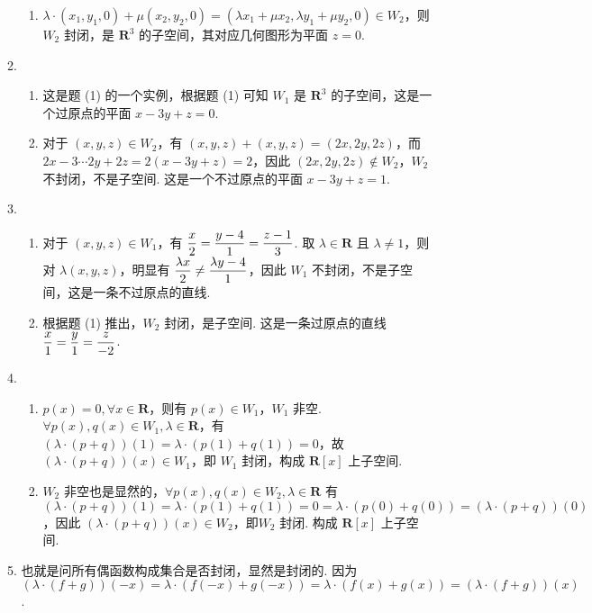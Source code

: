 \begin{enumerate}
\begin{enumerate}
\begin{enumerate}
                        \item $\lambda\cdot(x_1,y_1,0)+\mu(x_2,y_2,0)=(\lambda x_1+\mu x_2,\lambda y_1+\mu y_2,0)\in W_2$，则 $W_2$ 封闭，是 $\mathbf{R}^3$ 的子空间，其对应几何图形为平面 $z=0$.
                    \end{enumerate}

              \item \begin{enumerate}
                        \item 这是题 (1) 的一个实例，根据题 (1) 可知 $W_1$ 是 $\mathbf{R}^3$ 的子空间，这是一个过原点的平面 $x-3y+z=0$.

                        \item 对于 $(x,y,z)\in W_2$，有 $(x,y,z)+(x,y,z)=(2x,2y,2z)$，而 $2x-3\cdots 2y+2z=2(x-3y+z)=2$，因此 $(2x,2y,2z)\not \in W_2$，$W_2$ 不封闭，不是子空间. 这是一个不过原点的平面 $x-3y+z=1$.
                    \end{enumerate}

              \item \begin{enumerate}
                        \item 对于 $(x,y,z)\in W_1$，有 $\vspace{1ex}\dfrac x2=\dfrac{y-4}1=\dfrac{z-1}3$. 取 $\lambda \in \mathbf{R}$ 且 $\lambda\neq 1$，则对 $\lambda(x,y,z)$，明显有 $\vspace{1ex}\dfrac{\lambda x}2\neq\dfrac{\lambda y-4}1$，因此 $W_1$ 不封闭，不是子空间，这是一条不过原点的直线.

                        \item 根据题 (1) 推出，$W_2$ 封闭，是子空间. 这是一条过原点的直线 $\vspace{1ex}\dfrac x1=\dfrac y1=\dfrac z{-2}$.
                    \end{enumerate}

              \item \begin{enumerate}
                        \item $p(x)=0,\forall x\in \mathbf{R}$，则有 $p(x)\in W_1$，$W_1$ 非空. $\forall p(x),q(x)\in W_1,\lambda \in\mathbf{R}$，有 $(\lambda\cdot(p+q))(1)=\lambda\cdot(p(1)+q(1))=0$，故$(\lambda\cdot(p+q))(x)\in W_1$，即 $W_1$ 封闭，构成 $\mathbf{R}[x]$ 上子空间.

                        \item $W_2$ 非空也是显然的，$\forall p(x),q(x)\in W_2, \lambda \in \mathbf{R}$ 有 $(\lambda\cdot(p+q))(1)=\lambda\cdot(p(1)+q(1))=0=\lambda\cdot(p(0)+q(0))=(\lambda\cdot(p+q))(0)$，因此 $(\lambda\cdot(p+q))(x)\in W_2$，即$W_2$ 封闭. 构成 $\mathbf{R}[x]$ 上子空间.
                    \end{enumerate}

              \item 也就是问所有偶函数构成集合是否封闭，显然是封闭的. 因为 $(\lambda\cdot(f+g))(-x)=\lambda\cdot(f(-x)+g(-x))=\lambda\cdot(f(x)+g(x))=(\lambda\cdot(f+g))(x)$.
          \end{enumerate}
\end{enumerate}

